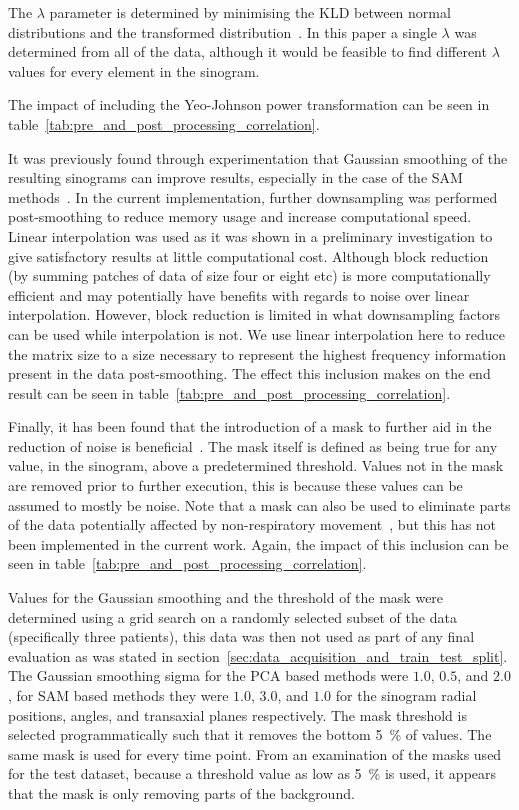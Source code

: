         The $\lambda$ parameter is determined by minimising the \gls{KLD} between normal distributions and the transformed distribution~\parencite{Yeo2000ASymmetry}. In this paper a single $\lambda$  was determined from all of the data, although it would be feasible to find different $\lambda$ values for every element in the sinogram.

        The impact of including the Yeo-Johnson power transformation can be seen in table~\ref{tab:pre_and_post_processing_correlation}.
        
        It was previously found through experimentation that Gaussian smoothing of the resulting sinograms can improve results, especially in the case of the \gls{SAM} methods~\parencite{Thielemans2013ComparisonData}. In the current implementation, further downsampling was performed post-smoothing to reduce memory usage and increase computational speed. Linear interpolation was used as it was shown in a preliminary investigation to give satisfactory results at little computational cost. Although block reduction (by summing patches of data of size four or eight etc) is more computationally efficient and may potentially have benefits with regards to noise over linear interpolation. However, block reduction is limited in what downsampling factors can be used while interpolation is not. We use linear interpolation here to reduce the matrix size to a size necessary to represent the highest frequency information present in the data post-smoothing. The effect this inclusion makes on the end result can be seen in table~\ref{tab:pre_and_post_processing_correlation}.
        
        Finally, it has been found that the introduction of a mask to further aid in the reduction of noise is beneficial~\parencite{Thielemans2011}. The mask itself is defined as being true for any value, in the sinogram, above a predetermined threshold. Values not in the mask are removed prior to further execution, this is because these values can be assumed to mostly be noise. Note that a mask can also be used to eliminate parts of the data potentially affected by non-respiratory movement~\parencite{Bertolli2018Data-DrivenTomography}, but this has not been implemented in the current work. Again, the impact of this inclusion can be seen in table~\ref{tab:pre_and_post_processing_correlation}.

        Values for the Gaussian smoothing and the threshold of the mask were determined using a grid search on a randomly selected subset of the data (specifically three patients), this data was then not used as part of any final evaluation as was stated in section~\ref{sec:data_acquisition_and_train_test_split}. The Gaussian smoothing sigma for the \gls{PCA} based methods were $1.0$, $0.5$, and $2.0$, for \gls{SAM} based methods they were $1.0$, $3.0$, and $1.0$ for the sinogram radial positions, angles, and transaxial planes respectively. The mask threshold is selected programmatically such that it removes the bottom \SI{5}{\percent} of values. The same mask is used for every time point. From an examination of the masks used for the test dataset, because a threshold value as low as \SI{5}{\percent} is used, it appears that the mask is only removing parts of the background.

